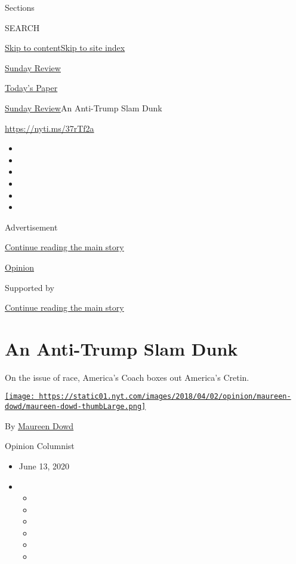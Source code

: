 Sections

SEARCH

\protect\hyperlink{site-content}{Skip to
content}\protect\hyperlink{site-index}{Skip to site index}

\href{https://www.nytimes.com/section/opinion/sunday}{Sunday Review}

\href{https://myaccount.nytimes.com/auth/login?response_type=cookie\&client_id=vi}{}

\href{https://www.nytimes.com/section/todayspaper}{Today's Paper}

\href{/section/opinion/sunday}{Sunday Review}\textbar{}An Anti-Trump
Slam Dunk

\href{https://nyti.ms/37rTf2a}{https://nyti.ms/37rTf2a}

\begin{itemize}
\item
\item
\item
\item
\item
\item
\end{itemize}

Advertisement

\protect\hyperlink{after-top}{Continue reading the main story}

\href{/section/opinion}{Opinion}

Supported by

\protect\hyperlink{after-sponsor}{Continue reading the main story}

\hypertarget{an-anti-trump-slam-dunk}{%
\section{An Anti-Trump Slam Dunk}\label{an-anti-trump-slam-dunk}}

On the issue of race, America's Coach boxes out America's Cretin.

\href{https://www.nytimes.com/by/maureen-dowd}{\texttt{[image: https://static01.nyt.com/images/2018/04/02/opinion/maureen-dowd/maureen-dowd-thumbLarge.png]}}

By \href{https://www.nytimes.com/by/maureen-dowd}{Maureen Dowd}

Opinion Columnist

\begin{itemize}
\item
  June 13, 2020
\item
  \begin{itemize}
  \item
  \item
  \item
  \item
  \item
  \item
  \end{itemize}
\end{itemize}

